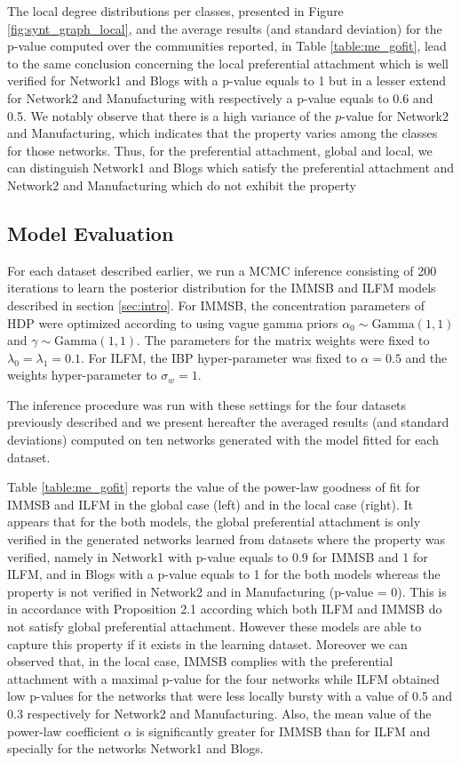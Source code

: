 The local degree distributions per classes, presented in Figure \ref{fig:synt_graph_local}, and the average results (and standard deviation) for the p-value computed over the communities reported, in Table \ref{table:me_gofit}, lead to the same conclusion concerning the local preferential attachment which is well verified for Network1 and Blogs with a p-value equals to 1 but in a lesser extend for Network2 and Manufacturing with respectively a p-value equals to 0.6 and 0.5. We notably observe that there is a high variance of the $p$-value for Network2 and Manufacturing, which indicates that the property varies among the classes for those networks. Thus, for the preferential attachment, global and local, we can distinguish Network1 and Blogs which satisfy the preferential attachment and Network2 and Manufacturing which do not exhibit the property






\subsection{Model Evaluation}
For each dataset described earlier, we run a MCMC inference consisting of 200 iterations to learn the posterior distribution for the IMMSB and ILFM  models described in section \ref{sec:intro}. For IMMSB, the concentration parameters of HDP were optimized according to \cite{HDP} using vague gamma priors $\alpha_0 \sim \text{Gamma}(1,1)$ and $\gamma \sim \text{Gamma}(1,1)$. The parameters for the matrix weights were fixed to $\lambda_0=\lambda_1=0.1$. For ILFM, the IBP hyper-parameter was fixed to $\alpha=0.5$ and the weights hyper-parameter to $\sigma_w = 1$. 

The inference procedure was run with these settings for the four datasets previously described and we present hereafter the averaged results (and standard deviations) computed on ten networks generated with the model fitted for each dataset.

Table \ref{table:me_gofit} reports the value of the power-law goodness of fit for IMMSB and ILFM in the global case (left) and in the local case (right). It appears that for the both models, the global preferential attachment is only verified in the generated networks learned from datasets where the property was verified, namely in Network1 with p-value equals to 0.9 for IMMSB and 1 for ILFM, and in Blogs with a p-value equals to 1 for the both models whereas the property is not verified in Network2 and in Manufacturing (p-value = 0). This is in accordance with Proposition 2.1  according which both ILFM and IMMSB do not satisfy global preferential attachment. However these models are able to capture this property if it exists in the learning dataset.  Moreover we can observed that, in the local case, IMMSB complies with the preferential attachment with a maximal p-value for the four networks while ILFM obtained low p-values for the networks that were less locally bursty with a value of 0.5 and 0.3 respectively for Network2 and Manufacturing. Also, the mean value of the power-law coefficient $\alpha$ is significantly greater for IMMSB than for ILFM and specially for the networks Network1 and Blogs.

